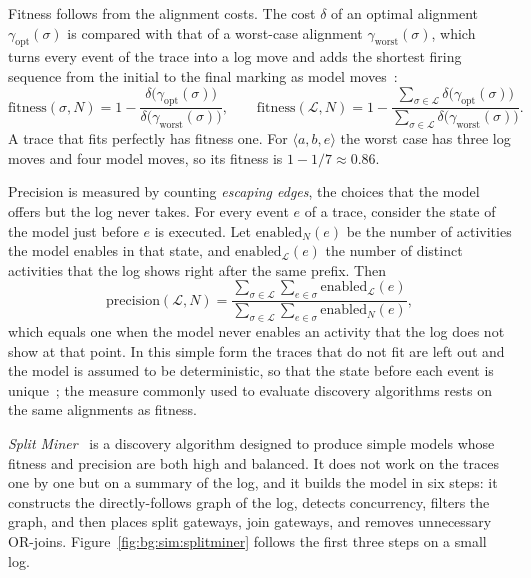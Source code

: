     Fitness follows from the alignment costs. The cost $\delta$ of an optimal
    alignment $\gamma_{\mathrm{opt}}(\sigma)$ is compared with that of a
    worst-case alignment $\gamma_{\mathrm{worst}}(\sigma)$, which turns every event
    of the trace into a log move and adds the shortest firing sequence from the
    initial to the final marking as model moves~\cite{vanderaalst2016}:
    \begin{equation}
    \mathrm{fitness}(\sigma, N) =
    1 - \frac{\delta\bigl(\gamma_{\mathrm{opt}}(\sigma)\bigr)}
             {\delta\bigl(\gamma_{\mathrm{worst}}(\sigma)\bigr)},
    \qquad
    \mathrm{fitness}(\mathcal{L}, N) =
    1 - \frac{\sum_{\sigma \in \mathcal{L}} \delta\bigl(\gamma_{\mathrm{opt}}(\sigma)\bigr)}
             {\sum_{\sigma \in \mathcal{L}} \delta\bigl(\gamma_{\mathrm{worst}}(\sigma)\bigr)}.
    \label{eq:bg:sim:fitness}
    \end{equation}
    A trace that fits perfectly has fitness one. For
    $\langle a, b, e \rangle$ the worst case has three log moves and four model
    moves, so its fitness is $1 - 1/7 \approx 0.86$.
    
    Precision is measured by counting \emph{escaping edges}, the choices that the
    model offers but the log never takes. For every
    event $e$ of a trace, consider the state of the model just before $e$ is
    executed. Let $\mathrm{enabled}_N(e)$ be the number of activities the model
    enables in that state, and $\mathrm{enabled}_{\mathcal{L}}(e)$ the number of
    distinct activities that the log shows right after the same prefix. Then
    \begin{equation}
    \mathrm{precision}(\mathcal{L}, N) =
    \frac{\sum_{\sigma \in \mathcal{L}} \sum_{e \in \sigma} \mathrm{enabled}_{\mathcal{L}}(e)}
         {\sum_{\sigma \in \mathcal{L}} \sum_{e \in \sigma} \mathrm{enabled}_N(e)},
    \label{eq:bg:sim:precision}
    \end{equation}
    which equals one when the model never enables an activity that the log does
    not show at that point. In this simple form the traces that do not fit are
    left out and the model is assumed to be deterministic, so that the state
    before each event is unique~\cite{carmona2022conformance}; the measure
    commonly used to evaluate discovery algorithms rests on the same alignments
    as fitness.
    
    \emph{Split Miner}~\cite{augusto2019splitminer} is a discovery algorithm
    designed to produce simple models whose fitness and precision are both high
    and balanced. It does not work on the traces one by one but on a summary of
    the log, and it builds the model in six steps: it constructs the
    directly-follows graph of the log, detects concurrency, filters the graph,
    and then places split gateways, join gateways, and removes unnecessary
    OR-joins. Figure~\ref{fig:bg:sim:splitminer} follows the first three steps on
    a small log.
    

